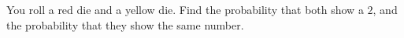 You roll a red die and a yellow die. Find the probability that both show a $2$, and the probability that they show the same number.

